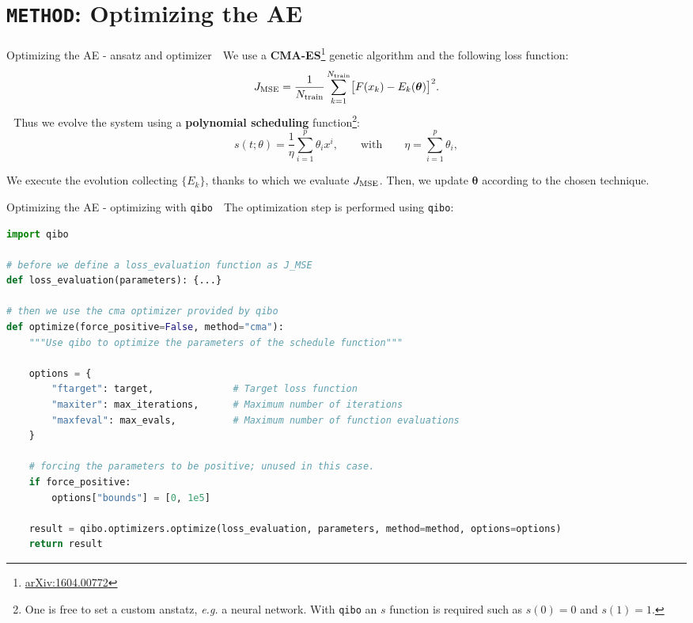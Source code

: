\documentclass[8pt, xcolor={svgnames}, hyperref={colorlinks, linkcolor=black, citecolor=amethyst, urlcolor=amethyst}]{beamer}
\begin{document}
\section{\texttt{METHOD}: Optimizing the AE}

\begin{frame}[fragile]{Optimizing the AE - ansatz and optimizer}
\large
\faArrowCircleRight\,\, We use a \textbf{CMA-ES}\footnote{\href{https://arxiv.org/abs/1604.00772}{arXiv:1604.00772}} 
genetic algorithm and the following loss function:
\begin{equation}
    J_{\rm MSE} = \frac{1}{N_{\rm train}} \sum_{k = 1}^{N_{\rm train}} 
    \bigl[ F(x_k) - E_k(\bm{\theta}) \bigr]^2.
    \label{eq:loss_function}
\end{equation}
\pause
\faArrowCircleRight\,\, Thus we evolve the system using a \textbf{polynomial scheduling} function\footnote{One is free to set
a custom anstatz, \textit{e.g.} a neural network. With \texttt{qibo} an $s$ function 
is required such as $s(0)=0$ and $s(1)=1$.}:
\begin{equation}
s(t;\theta) = \frac{1}{\eta} \sum_{i=1}^{p} \theta_i x^{i}, \qquad
\text{with} \qquad \eta = \sum_{i=1}^{p} \theta_i,
\label{eq:scheduling_ansatz}
\end{equation}
\pause  
\vspace{0.1cm}
\begin{tcolorbox}[colback=amethyst!15, title=In each optimization step]
    We execute the evolution collecting $\{E_k\}    $, thanks to which we evaluate
    $J_{\rm MSE}$. Then, we update $\bm{\theta}$ according to the chosen technique.
\end{tcolorbox}
\end{frame}

\begin{frame}[fragile]{Optimizing the AE - optimizing with \texttt{qibo}}
\large
\faArrowCircleRight\,\, The optimization step is performed using \texttt{qibo}:
\begin{tcolorbox}
\begin{lstlisting}[language=Python]
import qibo 

# before we define a loss_evaluation function as J_MSE
def loss_evaluation(parameters): {...}

# then we use the cma optimizer provided by qibo
def optimize(force_positive=False, method="cma"):
    """Use qibo to optimize the parameters of the schedule function"""

    options = {
        "ftarget": target,              # Target loss function
        "maxiter": max_iterations,      # Maximum number of iterations
        "maxfeval": max_evals,          # Maximum number of function evaluations
    }
    
    # forcing the parameters to be positive; unused in this case.
    if force_positive:
        options["bounds"] = [0, 1e5]
        
    result = qibo.optimizers.optimize(loss_evaluation, parameters, method=method, options=options)
    return result
\end{lstlisting}
\end{tcolorbox}
\end{frame}
\end{document}
